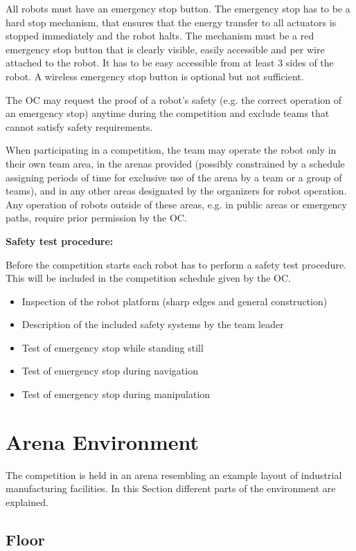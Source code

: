 All robots must have an emergency stop button. The emergency stop has to be a hard stop mechanism, that ensures that the energy transfer to all actuators is stopped immediately and the robot halts. The mechanism must be a red emergency stop button that is clearly visible, easily accessible and per wire attached to the robot. It has to be easy accessible from at least 3 sides of the robot. A wireless emergency stop button is optional but not sufficient.

The OC may request the proof of a robot's safety (e.g. the correct operation of an emergency stop) anytime during the competition and exclude teams that cannot satisfy safety requirements.

When participating in a competition, the team may operate the robot only in their own team area, in the arenas provided (possibly constrained by a schedule assigning periods of time for exclusive use of the arena by a team or a group of teams), and in any other areas designated by the organizers for robot operation. Any operation of robots outside of these areas, e.g. in public areas or emergency paths, require prior permission by the OC.

\textbf{Safety test procedure:}

Before the competition starts each robot has to perform a safety test procedure. This will be included in the competition schedule given by the OC.
\begin{itemize}
	\item Inspection of the robot platform (sharp edges and general construction)
	\item Description of the included safety systems by the team leader 
	\item Test of emergency stop while standing still
	\item Test of emergency stop during navigation 
	\item Test of emergency stop during manipulation
\end{itemize}


\clearpage

\section{Arena Environment}
\label{sec:ArenaDesign}
The competition is held in an arena resembling an example layout of industrial manufacturing facilities. In this Section different parts of the environment are explained.

\subsection{Floor}


